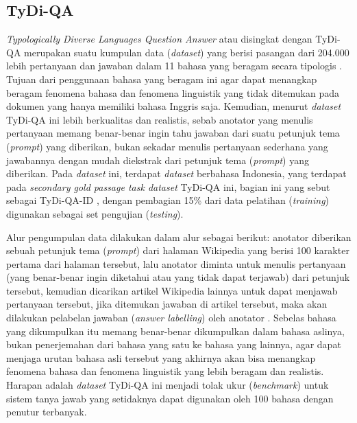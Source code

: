 \subsection{TyDi-QA}
\emph{Typologically Diverse Languages Question Answer} atau disingkat dengan TyDi-QA merupakan suatu kumpulan data (\emph{dataset}) yang berisi pasangan dari 204.000 lebih pertanyaan dan jawaban dalam 11 bahasa yang beragam secara tipologis \citep{clark-etal-2020-tydi}. Tujuan dari penggunaan bahasa yang beragam ini agar dapat menangkap beragam fenomena bahasa dan fenomena linguistik yang tidak ditemukan pada dokumen yang hanya memiliki bahasa Inggris saja. Kemudian, menurut \citet{clark-etal-2020-tydi} \emph{dataset} TyDi-QA ini lebih berkualitas dan realistis, sebab anotator yang menulis pertanyaan memang benar-benar ingin tahu jawaban dari suatu petunjuk tema (\emph{prompt}) yang diberikan, bukan sekadar menulis pertanyaan sederhana yang jawabannya dengan mudah diekstrak dari petunjuk tema (\emph{prompt}) yang diberikan. Pada \emph{dataset} ini, terdapat \emph{dataset} berbahasa Indonesia, yang terdapat pada \emph{secondary gold passage task dataset} TyDi-QA ini, bagian ini yang \citet{cahyawijaya-etal-2021-indonlg} sebut sebagai TyDi-QA-ID , dengan pembagian 15\% dari data pelatihan (\emph{training}) digunakan sebagai set pengujian (\emph{testing}).

Alur pengumpulan data dilakukan dalam alur sebagai berikut: anotator diberikan sebuah petunjuk tema (\emph{prompt}) dari halaman Wikipedia yang berisi 100 karakter pertama dari halaman tersebut, lalu anotator diminta untuk menulis pertanyaan (yang benar-benar ingin diketahui atau yang tidak dapat terjawab) dari petunjuk tersebut, kemudian dicarikan artikel Wikipedia lainnya untuk dapat menjawab pertanyaan tersebut, jika ditemukan jawaban di artikel tersebut, maka akan dilakukan pelabelan jawaban (\emph{answer labelling}) oleh anotator \citep{clark-etal-2020-tydi}. Sebelas bahasa yang dikumpulkan itu memang benar-benar dikumpulkan dalam bahasa aslinya, bukan penerjemahan dari bahasa yang satu ke bahasa yang lainnya, agar dapat menjaga urutan bahasa asli tersebut yang akhirnya akan bisa menangkap fenomena bahasa dan fenomena linguistik yang lebih beragam dan realistis. Harapan \citet{clark-etal-2020-tydi} adalah \emph{dataset} TyDi-QA ini menjadi tolak ukur (\emph{benchmark}) untuk sistem tanya jawab yang setidaknya dapat digunakan oleh 100 bahasa dengan penutur terbanyak.

